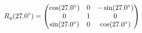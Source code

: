 \documentclass[preview]{standalone}
\begin{document}
\begin{align*}
\special{dvisvgm:raw <g id='unique000'>}R_y(27.0^\circ) = \begin{pmatrix} \cos(27.0^\circ) & 0 & -\sin(27.0^\circ) \\ 0 & 1 & 0 \\ \sin(27.0^\circ) & 0 & \cos(27.0^\circ) \end{pmatrix}\special{dvisvgm:raw </g>}
\end{align*}
\end{document}
